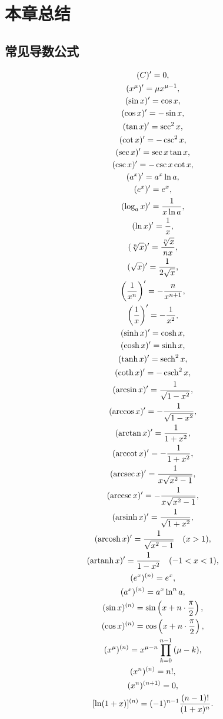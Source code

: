 \section{本章总结}
\subsection{常见导数公式}
\begin{gather*}
	(C)' = 0, \\
	(x^\mu)' = \mu x^{\mu-1}, \\
	(\sin x)' = \cos x, \\
	(\cos x)' = - \sin x, \\
	(\tan x)' = \sec^2 x, \\
	(\cot x)' = - \csc^2 x, \\
	(\sec x)' = \sec x \tan x, \\
	(\csc x)' = - \csc x \cot x, \\
	(a^x)' = a^x \ln a, \\
	(e^x)' = e^x, \\
	(\log_a x)' = \frac{1}{x \ln a}, \\
	(\ln x)' = \frac{1}{x}, \\
	(\sqrt[n]{x})' = \frac{\sqrt[n]{x}}{n x}, \\
	(\sqrt{x})' = \frac{1}{2\sqrt{x}}, \\
	\left(\frac{1}{x^n}\right)' = -\frac{n}{x^{n+1}}, \\
	\left(\frac{1}{x}\right)' = -\frac{1}{x^2}, \\
	(\sinh x)' = \cosh x, \\
	(\cosh x)' = \sinh x, \\
	(\tanh x)' = \sech^2 x, \\
	(\coth x)' = -\csch^2 x, \\
	(\arcsin x)' = \frac{1}{\sqrt{1 - x^2}}, \\
	(\arccos x)' = - \frac{1}{\sqrt{1 - x^2}}, \\
	(\arctan x)' = \frac{1}{1 + x^2}, \\
	(\arccot x)' = - \frac{1}{1 + x^2}, \\
	(\arcsec x)' = \frac{1}{x \sqrt{x^2-1}}, \\
	(\arccsc x)' = -\frac{1}{x \sqrt{x^2-1}}, \\
	(\arsinh x)' = \frac{1}{\sqrt{1 + x^2}}, \\
	(\arcosh x)' = \frac{1}{\sqrt{x^2 - 1}} \quad (x > 1), \\
	(\artanh x)' = \frac{1}{1 - x^2} \quad (-1 < x < 1), \\
	(e^x)^{(n)} = e^x, \\
	(a^x)^{(n)} = a^x \ln^n a, \\
	(\sin x)^{(n)} = \sin \left( x + n \cdot \frac{\pi}{2} \right), \\
	(\cos x)^{(n)} = \cos \left( x + n \cdot \frac{\pi}{2} \right), \\
	(x^\mu)^{(n)} = x^{\mu-n}\prod_{k=0}^{n-1} {(\mu - k)}, \\
	(x^n)^{(n)} = n!, \\
	(x^n)^{(n+1)} = 0, \\
	[\ln(1+x)]^{(n)} = (-1)^{n-1} \frac{(n-1)!}{(1+x)^n}.
\end{gather*}
